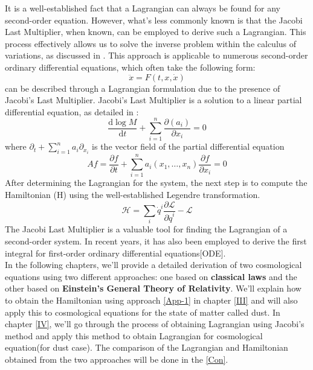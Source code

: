\documentclass[12pt]{article}
\begin{document}
It is a well-established fact that a Lagrangian can always be found for any second-order equation. However, what's less commonly known is that the Jacobi Last Multiplier, when known, can be employed to derive such a Lagrangian. This process effectively allows us to solve the inverse problem within the calculus of variations, as discussed in \cite{hojman2014construction}. This approach is applicable to numerous second-order ordinary differential equations, which often take the following form:
\begin{equation}
\ddot{x}=F(t, x, \dot{x})
\end{equation} 
can be described through a Lagrangian formulation due to the presence of Jacobi's Last Multiplier. Jacobi's Last Multiplier is a solution to a linear partial differential equation, as detailed in \cite{2008PhyS...78f5011N}: 
\begin{equation}
\frac{\mathrm{d} \log M}{\mathrm{d} t}+\sum_{i=1}^{n} \frac{\partial\left(a_{i}\right)}{\partial x_{i}}=0
\end{equation}
where $\partial_{t}+\sum_{i=1}^{n} a_{i} \partial_{x_{i}}$ is the vector field of the partial differential equation
\begin{equation}
A f=\frac{\partial f}{\partial t}+\sum_{i=1}^{n} a_{i}\left(x_{1}, \ldots, x_{n}\right) \frac{\partial f}{\partial x_{i}}=0
\end{equation}
After determining the Lagrangian for the system, the next step is to compute the Hamiltonian (H) using the well-established Legendre transformation.
\begin{equation}
\mathcal{H}=\sum_{i} \dot{q}^{i} \frac{\partial \mathcal{L}}{\partial \dot{q}^{i}}-\mathcal{L}
\end{equation}
The Jacobi Last Multiplier is a valuable tool for finding the Lagrangian of a second-order system. In recent years, it has also been employed to derive the first integral for first-order ordinary differential equations[ODE].\\
In the following chapters, we'll provide a detailed derivation of two cosmological equations using two different approaches: one based on \textbf{classical laws} and the other based on \textbf{Einstein's General Theory of Relativity}. We'll explain how to obtain the Hamiltonian using approach \ref{App-1} in chapter \ref{III} and will also apply this to cosmological equations for the state of matter called dust. In chapter \ref{IV}, we'll go through the process of obtaining Lagrangian using Jacobi's method and apply this method to obtain Lagrangian for cosmological equation(for dust case). The comparison of the Lagrangian and Hamiltonian obtained from the two approaches will be done in the \ref{Con}.
\end{document}
